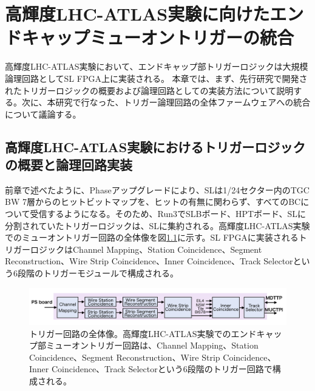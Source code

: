 \chapter{高輝度LHC-ATLAS実験に向けたエンドキャップミューオントリガーの統合}
\label{chap_TriggerIntegration}
高輝度LHC-ATLAS実験において、エンドキャップ部トリガーロジックは大規模論理回路としてSL FPGA上に実装される。
本章では、まず、先行研究で開発されたトリガーロジックの概要および論理回路としての実装方法について説明する。次に、本研究で行なった、トリガー論理回路の全体ファームウェアへの統合について議論する。

\section{高輝度LHC-ATLAS実験におけるトリガーロジックの概要と論理回路実装}
\label{sec_Phase2TriggerLogic}
前章で述べたように、Phase\two アップグレードにより、SLは1/24セクター内のTGC BW 7層からのヒットビットマップを、ヒットの有無に関わらず、すべてのBCについて受信するようになる。そのため、Run3でSLBボード、HPTボード、SLに分割されていたトリガーロジックは、SLに集約される。高輝度LHC-ATLAS実験でのミューオントリガー回路の全体像を図\ref{Trigger_over}に示す。SL FPGAに実装されるトリガーロジックはChannel Mapping、Station Coincidence、Segment Reconstruction、Wire Strip Coincidence、Inner Coincidence、Track Selectorという6段階のトリガーモジュールで構成される。

\begin{figure} 
\centering
\includegraphics[width=16cm]{fig/SL/Trigger_over.png}
\caption[トリガー回路の全体像]{トリガー回路の全体像。高輝度LHC-ATLAS実験でのエンドキャップ部ミューオントリガー回路は、Channel Mapping、Station Coincidence、Segment Reconstruction、Wire Strip Coincidence、Inner Coincidence、Track Selectorという6段階のトリガー回路で構成される。}
\label{Trigger_over}
\end{figure}

